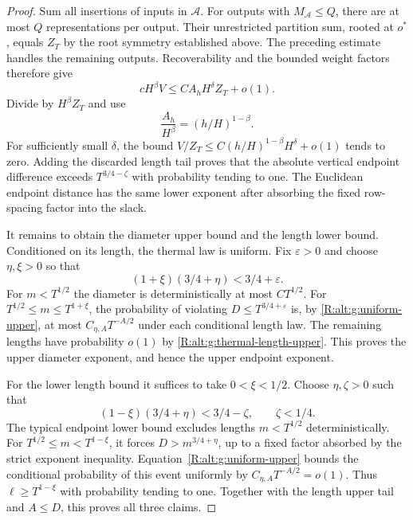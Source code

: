 \begin{proof}
Sum all insertions of inputs in $\mathcal A$. For outputs with
$M_{\mathcal A}\le Q$, there are at most $Q$ representations per
output. Their unrestricted partition sum, rooted at $o^*$, equals
$Z_T$ by the root symmetry established above. The preceding estimate
handles the remaining outputs. Recoverability and the bounded weight
factors therefore give
\begin{equation}\label{R:alt:g:insertion-mass}
 cH^\beta V\le C A_hH^\delta Z_T+o(1).
\end{equation}
Divide by $H^\beta Z_T$ and use
\[
 \frac{A_h}{H^\beta}=(h/H)^{1-\beta}.
\]
For sufficiently small $\delta$, the bound
$V/Z_T\le C(h/H)^{1-\beta}H^\delta+o(1)$ tends to zero. Adding the
discarded length tail proves that the absolute vertical endpoint
difference exceeds $T^{3/4-\zeta}$ with probability tending to one.
The Euclidean endpoint distance has the same lower exponent after
absorbing the fixed row-spacing factor into the slack.

It remains to obtain the diameter upper bound and the length lower
bound. Conditioned on its length, the thermal law is uniform. Fix
$\varepsilon>0$ and choose $\eta,\xi>0$ so that
\[
 (1+\xi)(3/4+\eta)<3/4+\varepsilon.
\]
For $m<T^{1/2}$ the diameter is deterministically at most $CT^{1/2}$.
For $T^{1/2}\le m\le T^{1+\xi}$, the probability of violating
$D\le T^{3/4+\varepsilon}$ is, by
\eqref{R:alt:g:uniform-upper}, at most
$C_{\eta,A}T^{-A/2}$ under each conditional length law. The remaining
lengths have probability $o(1)$ by
\eqref{R:alt:g:thermal-length-upper}. This proves the upper diameter
exponent, and hence the upper endpoint exponent.

For the lower length bound it suffices to take $0<\xi<1/2$.
Choose $\eta,\zeta>0$ such that
\[
 (1-\xi)(3/4+\eta)<3/4-\zeta,
 \qquad \zeta<1/4.
\]
The typical endpoint lower bound excludes lengths $m<T^{1/2}$
deterministically. For $T^{1/2}\le m<T^{1-\xi}$, it forces
$D>m^{3/4+\eta}$, up to a fixed factor absorbed by the strict exponent
inequality. Equation~\eqref{R:alt:g:uniform-upper} bounds the conditional
probability of this event uniformly by $C_{\eta,A}T^{-A/2}=o(1)$.
Thus $\ell\ge T^{1-\xi}$ with probability tending to one. Together
with the length upper tail and $A\le D$, this proves all three claims.
\end{proof}
